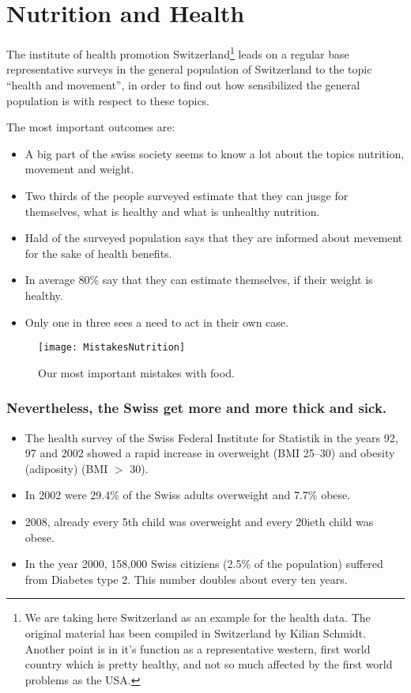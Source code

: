 \documentclass[../main.tex]{subfiles}
\begin{document}
\section{Nutrition and Health}

The institute of health promotion Switzerland\footnote{We are taking here Switzerland as an example for the health data.
  The original material has been compiled in Switzerland by Kilian Schmidt.
  Another point is in it's function as a representative western, first world country
  which is pretty healthy, and not so much affected by the first world problems as the USA.} leads on a regular base representative surveys
in the general population of Switzerland to the topic ``health and movement'',
in order to find out how sensibilized the general population is with respect to these topics.

The most important outcomes are:
\begin{itemize}
\item A big part of the swiss society seems to know a lot about the topics nutrition, movement and weight.
\item Two thirds of the people surveyed estimate that they can jusge for themselves, what is healthy and what is unhealthy nutrition.
\item Hald of the surveyed population says that they are informed about mevement for the sake of health benefits.
\item In average 80\% say that they can estimate themselves, if their weight is healthy.
\item Only one in three sees a need to act in their own case.
\end{itemize}

    \begin{figure}[htb!]
    \begin{center}
  \texttt{[image: MistakesNutrition]}
  \caption{Our most important mistakes with food.}
  \end{center}
  \end{figure}


  \subsubsection{Nevertheless, the Swiss get more and more thick and sick.}

  \begin{itemize}
  \item The health survey of the Swiss Federal Institute for Statistik in the years 92, 97 and 2002
    showed a rapid increase in overweight (BMI 25--30) and obesity (adiposity) (BMI $>$ 30).
  \item In 2002 were 29.4\% of the Swiss adults overweight and 7.7\% obese.
  \item 2008, already every 5th child was overweight and every 20ieth child was obese.
    \item In the year 2000, 158,000 Swiss citiziens (2.5\% of the population) suffered from Diabetes type 2. This number doubles about every ten years.
  \end{itemize}
\end{document}
